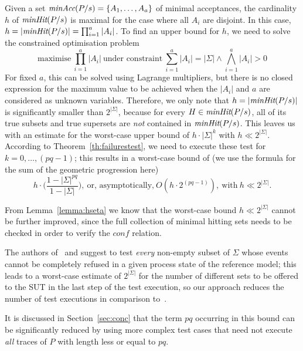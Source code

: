 Given a set $\text{\it minAcc}(P/s) = \{ A_1,\dots, A_a \}$ of   minimal acceptances,
the cardinality $h$ of $\text{\it minHit}(P/s)$ is maximal for the case where all $A_i$ are disjoint.
In this case,  $h=|\text{\it minHit}(P/s)| = \prod_{i=1}^a|A_i|$. To find an upper bound for $h$, 
we need to solve the constrained optimisation problem
\[
\text{maximise}\ \prod_{i=1}^a|A_i| \ \text{under constraint}\ \sum_{i=1}^a|A_i| = |\Sigma|
\wedge \bigwedge_{i=1}^a |A_i| > 0
\]
For fixed $a$, this can be solved using Lagrange multipliers, but there is no 
closed expression for the maximum value to be achieved when the $|A_i|$ 
and $a$ are considered as 
unknown variables. Therefore, we only note that $h=|\text{\it minHit}(P/s)|$ is significantly smaller
than $2^{|\Sigma|}$, because for every $H\in  \text{\it minHit}(P/s)$, all of its true subsets and true supersets are {\it not} contained in $\text{\it minHit}(P/s)$. This leaves us with an estimate
for the worst-case upper bound of $h\cdot |\Sigma|^k$ with $h\ll 2^{|\Sigma|}$.
According to Theorem~\ref{th:failurestest},
we need to execute these test for $k = 0,\dots,(pq-1)$; this results in a worst-case bound
of (we use the formula for the sum of the geometric progression here)
\[
h\cdot \big( \frac{1-|\Sigma|^{pq}}{1-|\Sigma|} \big),\
 \text{or, asymptotically,}\  O(h\cdot2^{(pq-1)}), 
 \  \text{with}\ h\ll 2^{|\Sigma|}.
\]

From Lemma~\ref{lemma:hseta} we know that 
 the worst-case bound $h\ll 2^{|\Sigma|}$ cannot be further improved, since 
the full collection of minimal hitting sets needs to be checked in order to verify
the $conf$ relation.




The authors of~\cite{Hennessy:1988:ATP:50497} and \cite{DBLP:conf/icfem/CavalcantiG07} 
suggest to test {\it every}
non-empty 
subset of $\Sigma$ whose events cannot be completely refused in a given process state
of the reference model; this leads to a worst-case estimate of $2^{|\Sigma|}$
for the number of different sets to be offered to the SUT in the last step of 
the test execution, so our approach reduces the number of test executions in comparison
 to~\cite{Hennessy:1988:ATP:50497,DBLP:conf/icfem/CavalcantiG07}. 




 
It is discussed in Section~\ref{sec:conc} that the term $pq$ occurring in this bound can be significantly reduced by using more complex test cases that need not execute {\it all} 
traces of $P$ with length less or equal to $pq$.












